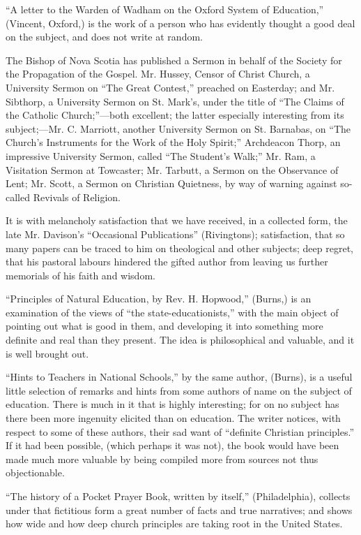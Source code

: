 ``A letter to the Warden of Wadham on the Oxford
System of Education,'' (Vincent, Oxford,) is the work of a person who has
evidently thought a good deal on the subject, and does not write at
random.

The Bishop of Nova Scotia has published a Sermon in
behalf of the Society for the Propagation of the Gospel. Mr. Hussey,
Censor of Christ Church, a University Sermon on ``The Great Contest,''
preached on Easterday; and Mr. Sibthorp, a University Sermon on St. Mark's,
under the title of ``The Claims of the Catholic Church;''—both
excellent; the latter especially interesting from its subject;—Mr. C.
Marriott, another University Sermon on St. Barnabas, on ``The Church's
Instruments for the Work of the Holy Spirit;'' Archdeacon Thorp, an
impressive University Sermon, called ``The Student's Walk;'' Mr. Ram, a
Visitation Sermon at Towcaster; Mr. Tarbutt, a Sermon on the Observance
of Lent; Mr. Scott, a Sermon on Christian Quietness, by way of warning
against so-called Revivals of Religion.

It is with melancholy satisfaction that we have
received, in a collected form, the late Mr. Davison's ``Occasional
Publications'' (Rivingtons); satisfaction, that so many papers can be
traced to him on theological and other subjects; deep regret, that his
pastoral labours hindered the gifted author from leaving us further
memorials of his faith and wisdom.

``Principles of Natural Education, by Rev. H.
Hopwood,'' (Burns,) is an examination of the views of ``the
state-educationists,'' with the main object of pointing out what is good
in them, and developing it into something more definite and real than
they present. The idea is philosophical and valuable, and it is well
brought out.

``Hints to Teachers in National Schools,'' by the
same author, (Burns), is a useful little selection of remarks and hints
from some authors of name on the subject of education. There is much in
it that is highly interesting; for on no subject has there been more
ingenuity elicited than on education. The writer notices, with respect
to some of these authors, their sad want of ``definite Christian
principles.'' If it had been possible, (which perhaps it was not), the
book would have been made much more valuable by being compiled more from
sources not thus objectionable.

``The history of a Pocket Prayer Book, written by
itself,'' (Philadelphia), collects under that fictitious form a great
number of facts and true narratives; and shows how wide and how deep
church principles are taking root in the United States.


